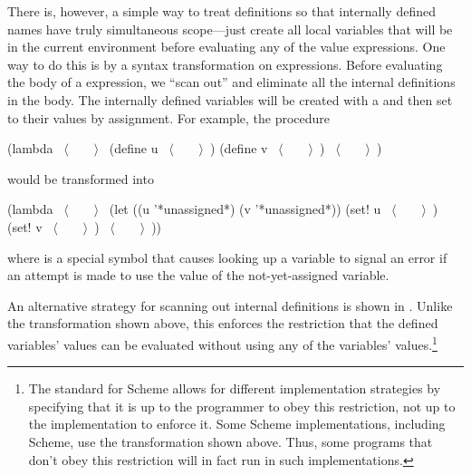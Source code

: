 There is, however, a simple way to treat definitions so that internally defined
names have truly simultaneous scope---just create all local variables that will
be in the current environment before evaluating any of the value expressions.
One way to do this is by a syntax transformation on  expressions.
Before evaluating the body of a  expression, we ``scan out'' and
eliminate all the internal definitions in the body.  The internally defined
variables will be created with a  and then set to their values by
assignment.  For example, the procedure

\begin{codeBlock}
(lambda ~\(\langle \)~~~~\(\rangle \)~
  (define u ~\(\langle \)~~~~\(\rangle \)~)
  (define v ~\(\langle \)~~~~\(\rangle \)~)
  ~\(\langle \)~~~~\(\rangle \)~)
\end{codeBlock}

\noindent
would be transformed into

\begin{codeBlock}
(lambda ~\(\langle \)~~~~\(\rangle \)~
  (let ((u '*unassigned*)
        (v '*unassigned*))
    (set! u ~\(\langle \)~~~~\(\rangle \)~)
    (set! v ~\(\langle \)~~~~\(\rangle \)~)
    ~\(\langle \)~~~~\(\rangle \)~))
\end{codeBlock}

\noindent
where  is a special symbol that causes looking up a variable
to signal an error if an attempt is made to use the value of the
not-yet-assigned variable.

An alternative strategy for scanning out internal definitions is shown in
.  Unlike the transformation shown above, this enforces the
restriction that the defined variables' values can be evaluated without using
any of the variables' values.\footnote{The  standard for Scheme
allows for different implementation strategies by specifying that it is up to
the programmer to obey this restriction, not up to the implementation to
enforce it.  Some Scheme implementations, including  Scheme, use
the transformation shown above.  Thus, some programs that don't obey this
restriction will in fact run in such implementations.}

